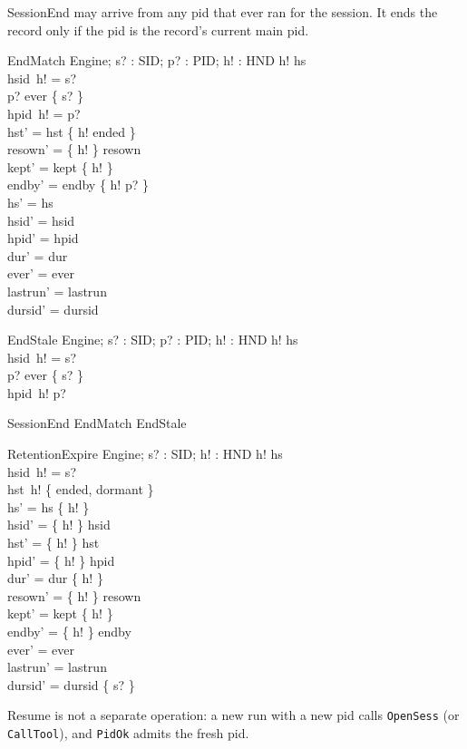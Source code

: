 \documentclass[a4paper,10pt,fleqn]{article}
\begin{document}
SessionEnd may arrive from any pid that ever ran for the session.  It ends
the record only if the pid is the record's current main pid.

\begin{schema}{EndMatch}
  \Delta Engine; s? : SID; p? : PID; h! : HND
\where
  h! \in hs \\
  hsid~h! = s? \\
  p? \in ever \limg \{ s? \} \rimg \\
  hpid~h! = p? \\
  hst' = hst \oplus \{ h! \mapsto ended \} \\
  resown' = \{ h! \} \ndres resown \\
  kept' = kept \setminus \{ h! \} \\
  endby' = endby \oplus \{ h! \mapsto p? \} \\
  hs' = hs \\
  hsid' = hsid \\
  hpid' = hpid \\
  dur' = dur \\
  ever' = ever \\
  lastrun' = lastrun \\
  dursid' = dursid
\end{schema}

\begin{schema}{EndStale}
  \Xi Engine; s? : SID; p? : PID; h! : HND
\where
  h! \in hs \\
  hsid~h! = s? \\
  p? \in ever \limg \{ s? \} \rimg \\
  hpid~h! \neq p?
\end{schema}

\begin{zed}
  SessionEnd  EndMatch \lor EndStale
\end{zed}

\begin{schema}{RetentionExpire}
  \Delta Engine; s? : SID; h! : HND
\where
  h! \in hs \\
  hsid~h! = s? \\
  hst~h! \in \{ ended, dormant \} \\
  hs' = hs \setminus \{ h! \} \\
  hsid' = \{ h! \} \ndres hsid \\
  hst' = \{ h! \} \ndres hst \\
  hpid' = \{ h! \} \ndres hpid \\
  dur' = dur \setminus \{ h! \} \\
  resown' = \{ h! \} \ndres resown \\
  kept' = kept \setminus \{ h! \} \\
  endby' = \{ h! \} \ndres endby \\
  ever' = ever \\
  lastrun' = lastrun \\
  dursid' = dursid \setminus \{ s? \}
\end{schema}

Resume is not a separate operation: a new run with a new pid calls
\texttt{OpenSess} (or \texttt{CallTool}), and \texttt{PidOk} admits the fresh
pid.
\end{document}

